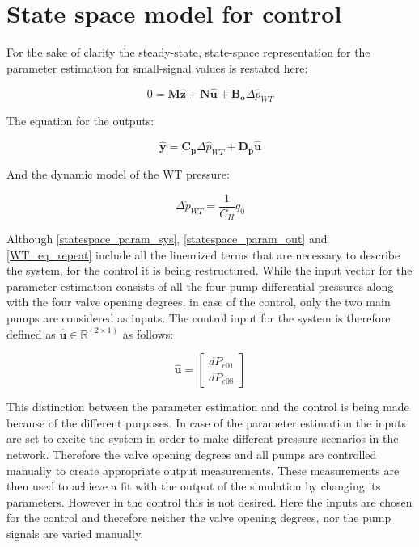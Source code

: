 \section{State space model for control}
 \label{SystemLin_control}
 
For the sake of clarity the steady-state, state-space representation for the parameter estimation for small-signal values is restated here:
 
 \begin{equation}
 0 = \pmb{M} \pmb{\hat{z}} + \pmb{N} \pmb{\hat{u}} + \pmb{B_o} \Delta \hat{p}_{WT}    
 \label{statespace_param_sys}
\end{equation}

The equation for the outputs:

\begin{equation}
  \pmb{\hat{y}} = \pmb{C_p} \Delta \hat{p}_{WT} + \pmb{D_p} \pmb{\hat{u}} 
   \label{statespace_param_out}
\end{equation}

And the dynamic model of the WT pressure:

\begin{equation}
\Delta \dot{p}_{WT} = \frac{1}{C_H} q_0
 \label{WT_eq_repeat}
\end{equation}

Although \eqref{statespace_param_sys}, \eqref{statespace_param_out} and \eqref{WT_eq_repeat} include all the linearized terms that are necessary to describe the system, for the control it is being restructured. While the input vector for the parameter estimation consists of all the four pump differential pressures along with the four valve opening degrees, in case of the control, only the two main pumps are considered as inputs. The control input for the system is therefore defined as $\pmb{\hat{u}} \in \pmb{\mathbb{R}}^{(2 \times 1)}$ as follows: 

\begin{equation}
\pmb{\hat{u}} =
\begin{bmatrix} 
dP_{e01} \\
dP_{e08} 
\label{inputvector_control}
\end{bmatrix} 
\end{equation}

This distinction between the parameter estimation and the control is being made because of the different purposes. In case of the parameter estimation the inputs are set to excite the system in order to make different pressure scenarios in the network. Therefore the valve opening degrees and all pumps are controlled manually to create appropriate output measurements. These measurements are then used to achieve a fit with the output of the simulation by changing its parameters. However in the control this is not desired. Here the inputs are chosen for the control and therefore neither the valve opening degrees, nor the pump signals are varied manually. 

